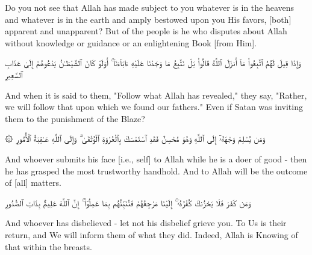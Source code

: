 \begin{translation}
	Do you not see that Allah has made subject to you whatever is in the heavens and whatever is in the earth and amply bestowed upon you His favors, [both] apparent and unapparent? But of the people is he who disputes about Allah without knowledge or guidance or an enlightening Book [from Him].
\end{translation}


\begin{edition*}
	\begin{Arabic}
		وَإِذَا قِيلَ لَهُمُ ٱتَّبِعُوا۟ مَآ أَنزَلَ ٱللَّهُ قَالُوا۟ بَلْ نَتَّبِعُ مَا وَجَدْنَا عَلَيْهِ ءَابَآءَنَآ ۚ أَوَلَوْ كَانَ ٱلشَّيْطَـٰنُ يَدْعُوهُمْ إِلَىٰ عَذَابِ ٱلسَّعِيرِ
	\end{Arabic}
\end{edition*}

\begin{translation}
	And when it is said to them, "Follow what Allah has revealed," they say, "Rather, we will follow that upon which we found our fathers." Even if Satan was inviting them to the punishment of the Blaze?
\end{translation}


\begin{edition*}
	\begin{Arabic}
		۞ وَمَن يُسْلِمْ وَجْهَهُۥٓ إِلَى ٱللَّهِ وَهُوَ مُحْسِنٌ فَقَدِ ٱسْتَمْسَكَ بِٱلْعُرْوَةِ ٱلْوُثْقَىٰ ۗ وَإِلَى ٱللَّهِ عَـٰقِبَةُ ٱلْأُمُورِ
	\end{Arabic}
\end{edition*}

\begin{translation}
	And whoever submits his face [i.e., self] to Allah while he is a doer of good - then he has grasped the most trustworthy handhold. And to Allah will be the outcome of [all] matters.
\end{translation}


\begin{edition*}
	\begin{Arabic}
		وَمَن كَفَرَ فَلَا يَحْزُنكَ كُفْرُهُۥٓ ۚ إِلَيْنَا مَرْجِعُهُمْ فَنُنَبِّئُهُم بِمَا عَمِلُوٓا۟ ۚ إِنَّ ٱللَّهَ عَلِيمٌۢ بِذَاتِ ٱلصُّدُورِ
	\end{Arabic}
\end{edition*}

\begin{translation}
	And whoever has disbelieved - let not his disbelief grieve you. To Us is their return, and We will inform them of what they did. Indeed, Allah is Knowing of that within the breasts.
\end{translation}


